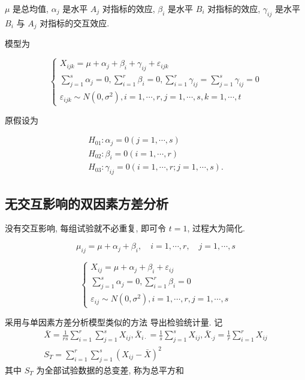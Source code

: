 \( \mu \) 是总均值, \( \alpha_{j} \) 是水平 \( A_{j} \) 对指标的效应, \( \beta_{i} \) 是水平 \( {B}_{i} \)
对指标的效应, \( \gamma_{i j} \) 是水平 \( B_{i} \) 与 \( A_{j} \) 对指标的交互效应. 

模型为

$$ \left\{\begin{array}{l}{X}_{i j k}=\mu+{\alpha}_{j}+\beta_{i}+\gamma_{i j}+\varepsilon_{i j k} \\ \sum_{j=1}^{s} \alpha_{j}=0, \sum_{i=1}^{r} \beta_{i}=0, \sum_{i=1}^{r} \gamma_{i j}=\sum_{j=1}^{s} \gamma_{i j}=0 \\ \varepsilon_{i j k} \sim N\left(0, \sigma^{2}\right), i=1, \cdots, r, j=1, \cdots, s, k=1, \cdots, t\end{array}\right. $$

原假设为

$$
\begin{array}{l}
H_{01}: \alpha_{j}=0(j=1, \cdots, s) \\
H_{02}: \beta_{i}=0(i=1, \cdots, r) \\
H_{03}: \gamma_{i j}=0(i=1, \cdots, r ; j=1, \cdots, s) .
\end{array}
$$

\subsection{无交互影响的双因素方差分析}

没有交互影响, 每组试验就不必重复, 即可令 \( {t}={1} \),
过程大为简化. 

$$
\mu_{i j}=\mu+\alpha_{j}+\beta_{i}, \quad i=1, \cdots, r, \quad j=1, \cdots, s
$$

$$ \left\{\begin{array}{l}X_{i j}=\mu+\alpha_{j}+\beta_{i}+\varepsilon_{i j} \\ \sum_{j=1}^{s} \alpha_{j}=0, \sum_{i=1}^{r} \beta_{i}=0 \\ \varepsilon_{i j} \sim N\left(0, \sigma^{2}\right), i=1, \cdots, r, j=1, \cdots, s\end{array}\right. $$

采用与单因素方差分析模型类似的方法 导出检验统计量. 
记
$$
\begin{array}{c}
\bar{X}=\frac{1}{r s} \sum_{i=1}^{r} \sum_{j=1}^{s} X_{i j}, \bar{X}_{i \cdot}=\frac{1}{s} \sum_{j=1}^{s} X_{i j}, \bar{X}_{\cdot j}=\frac{1}{r} \sum_{i=1}^{r} X_{i j} \\
S_{T}=\sum_{i=1}^{r} \sum_{j=1}^{s}\left(X_{i j}-\bar{X}\right)^{2}
\end{array}
$$
其中 \( S_{T} \) 为全部试验数据的总变差, 称为总平方和

